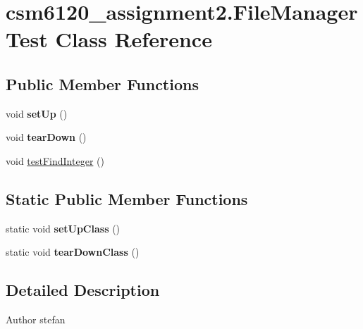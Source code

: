 \hypertarget{classcsm6120__assignment2_1_1_file_manager_test}{\section{csm6120\+\_\+assignment2.\+File\+Manager\+Test Class Reference}
\label{classcsm6120__assignment2_1_1_file_manager_test}
}
\subsection*{Public Member Functions}
\begin{DoxyCompactItemize}
\item 
\hypertarget{classcsm6120__assignment2_1_1_file_manager_test_ac48f6c49787415407d154bf801819f01}{void {\bfseries set\+Up} ()}\label{classcsm6120__assignment2_1_1_file_manager_test_ac48f6c49787415407d154bf801819f01}

\item 
\hypertarget{classcsm6120__assignment2_1_1_file_manager_test_a3d0ed647137e8493c34feee65af632db}{void {\bfseries tear\+Down} ()}\label{classcsm6120__assignment2_1_1_file_manager_test_a3d0ed647137e8493c34feee65af632db}

\item 
void \hyperlink{classcsm6120__assignment2_1_1_file_manager_test_a59498e89514290ed03b38020b1aafaed}{test\+Find\+Integer} ()
\end{DoxyCompactItemize}
\subsection*{Static Public Member Functions}
\begin{DoxyCompactItemize}
\item 
\hypertarget{classcsm6120__assignment2_1_1_file_manager_test_ac3f2050b127e51e3061717d37a54fbd0}{static void {\bfseries set\+Up\+Class} ()}\label{classcsm6120__assignment2_1_1_file_manager_test_ac3f2050b127e51e3061717d37a54fbd0}

\item 
\hypertarget{classcsm6120__assignment2_1_1_file_manager_test_a57410b5370ff7bde242ca0e98621ff21}{static void {\bfseries tear\+Down\+Class} ()}\label{classcsm6120__assignment2_1_1_file_manager_test_a57410b5370ff7bde242ca0e98621ff21}

\end{DoxyCompactItemize}


\subsection{Detailed Description}
\begin{DoxyAuthor}{Author}
stefan 
\end{DoxyAuthor}


